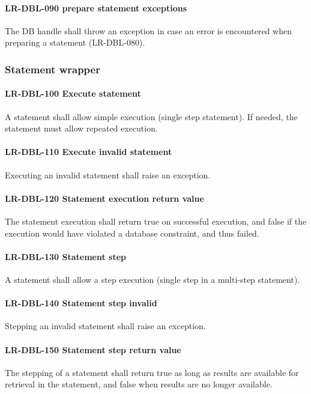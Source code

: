 \paragraph{LR-DBL-090 prepare statement exceptions}
The DB handle shall throw an exception in case an error is encountered when
preparing a statement (LR-DBL-080).

\subsubsection{Statement wrapper}
\paragraph{LR-DBL-100 Execute statement}
A statement shall allow simple execution (single step statement). If needed, the
statement must allow repeated execution.

\paragraph{LR-DBL-110 Execute invalid statement}
Executing an invalid statement shall raise an exception.

\paragraph{LR-DBL-120 Statement execution return value}
The statement execution shall return true on successful execution, and
false if the execution would have violated a database constraint, and thus
failed.

\paragraph{LR-DBL-130 Statement step}
A statement shall allow a step execution (single step in a multi-step
statement).

\paragraph{LR-DBL-140 Statement step invalid}
Stepping an invalid statement shall raise an exception.

\paragraph{LR-DBL-150 Statement step return value}
The stepping of a statement shall return true as long as results
are available for retrieval in the statement, and false when results
are no longer available.

